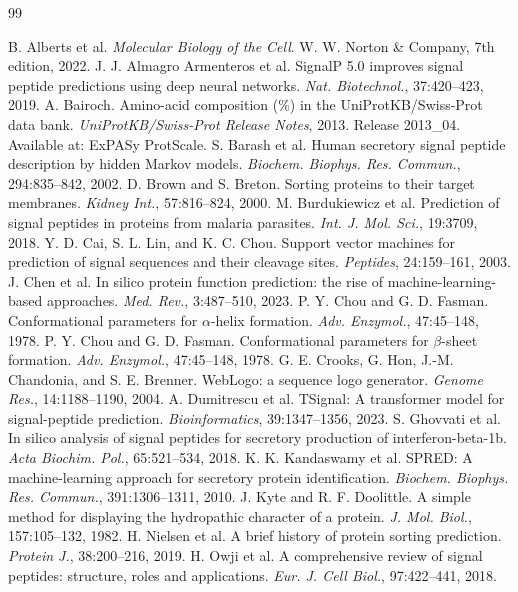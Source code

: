 \documentclass[unnumsec,webpdf,contemporary,large]{oup-authoring-template}
\begin{document}
\begin{thebibliography}{99}

 B. Alberts et al. \textit{Molecular Biology of the Cell}. W. W. Norton \& Company, 7th edition, 2022.
 J. J. Almagro Armenteros et al. SignalP 5.0 improves signal peptide predictions using deep neural networks. \textit{Nat. Biotechnol.}, 37:420--423, 2019.
 A. Bairoch. Amino-acid composition (\%) in the UniProtKB/Swiss-Prot data bank. \textit{UniProtKB/Swiss-Prot Release Notes}, 2013. Release 2013\_04. Available at: ExPASy ProtScale.
 S. Barash et al. Human secretory signal peptide description by hidden Markov models. \textit{Biochem. Biophys. Res. Commun.}, 294:835--842, 2002.
 D. Brown and S. Breton. Sorting proteins to their target membranes. \textit{Kidney Int.}, 57:816--824, 2000.
 M. Burdukiewicz et al. Prediction of signal peptides in proteins from malaria parasites. \textit{Int. J. Mol. Sci.}, 19:3709, 2018.
 Y. D. Cai, S. L. Lin, and K. C. Chou. Support vector machines for prediction of signal sequences and their cleavage sites. \textit{Peptides}, 24:159--161, 2003.
 J. Chen et al. In silico protein function prediction: the rise of machine-learning-based approaches. \textit{Med. Rev.}, 3:487--510, 2023.
 P. Y. Chou and G. D. Fasman. Conformational parameters for $\alpha$-helix formation. \textit{Adv. Enzymol.}, 47:45--148, 1978.
 P. Y. Chou and G. D. Fasman. Conformational parameters for $\beta$-sheet formation. \textit{Adv. Enzymol.}, 47:45--148, 1978.
 G. E. Crooks, G. Hon, J.-M. Chandonia, and S. E. Brenner. WebLogo: a sequence logo generator. \textit{Genome Res.}, 14:1188--1190, 2004.
 A. Dumitrescu et al. TSignal: A transformer model for signal-peptide prediction. \textit{Bioinformatics}, 39:1347--1356, 2023.
 S. Ghovvati et al. In silico analysis of signal peptides for secretory production of interferon-beta-1b. \textit{Acta Biochim. Pol.}, 65:521--534, 2018.
 K. K. Kandaswamy et al. SPRED: A machine-learning approach for secretory protein identification. \textit{Biochem. Biophys. Res. Commun.}, 391:1306--1311, 2010.
 J. Kyte and R. F. Doolittle. A simple method for displaying the hydropathic character of a protein. \textit{J. Mol. Biol.}, 157:105--132, 1982.
 H. Nielsen et al. A brief history of protein sorting prediction. \textit{Protein J.}, 38:200--216, 2019.
 H. Owji et al. A comprehensive review of signal peptides: structure, roles and applications. \textit{Eur. J. Cell Biol.}, 97:422--441, 2018.

\end{thebibliography}
\end{document}
